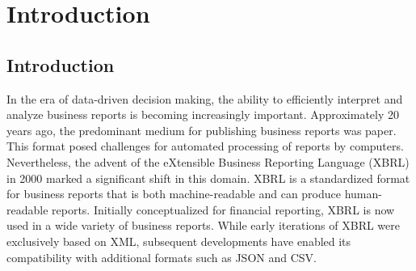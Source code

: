 \chapter{Introduction}
\label{sec:introduction}

\section{Introduction}


In the era of data-driven decision making, the ability to efficiently interpret and analyze business reports is becoming increasingly important.
Approximately 20 years ago,
the predominant medium for publishing business reports was paper.
This format posed challenges for automated processing of reports by computers. 
Nevertheless,
the advent of the eXtensible Business Reporting Language (XBRL) in 2000 marked a significant shift in this domain\cite{aicpa_xbrl_story}.
XBRL is a standardized format for business reports that is both machine-readable and can produce human-readable reports.
Initially conceptualized for financial reporting,
XBRL is now used in a wide variety of business reports.\cite{xbrl_about}
While early iterations of XBRL were exclusively based on XML, 
subsequent developments have enabled its compatibility with additional formats such as JSON and CSV.


